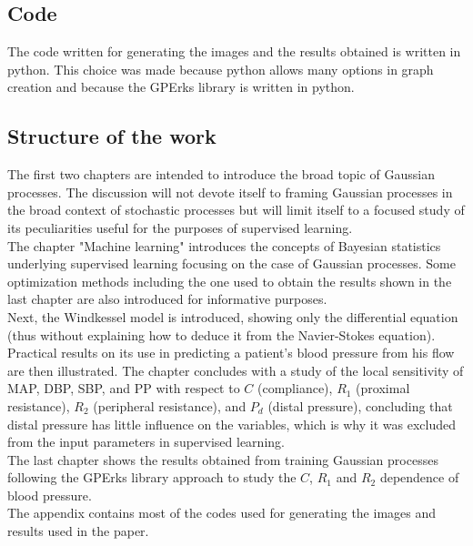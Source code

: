 \subsection{Code}
The code written for generating the images and the results obtained is written in python. This choice was made because python allows many options in graph creation and because the GPErks library is written in python.

\newpage

\subsection{Structure of the work}
The first two chapters are intended to introduce the broad topic of Gaussian processes. The discussion will not devote itself to framing Gaussian processes in the broad context of stochastic processes but will limit itself to a focused study of its peculiarities useful for the purposes of supervised learning.\\

The chapter "Machine learning" introduces the concepts of Bayesian statistics underlying supervised learning focusing on the case of Gaussian processes. Some optimization methods including the one used to obtain the results shown in the last chapter are also introduced for informative purposes.\\

Next, the Windkessel model is introduced, showing only the differential equation (thus without explaining how to deduce it from the Navier-Stokes equation). Practical results on its use in predicting a patient's blood pressure from his flow are then illustrated. The chapter concludes with a study of the local sensitivity of MAP, DBP, SBP, and PP with respect to $C$ (compliance), $R_1$ (proximal resistance), $R_2$ (peripheral resistance), and $P_d$ (distal pressure), concluding that distal pressure has little influence on the variables, which is why it was excluded from the input parameters in supervised learning. \\

The last chapter shows the results obtained from training Gaussian processes following the GPErks library approach to study the $C$, $R_1$ and $R_2$ dependence of blood pressure.\\

The appendix contains most of the codes used for generating the images and results used in the paper.